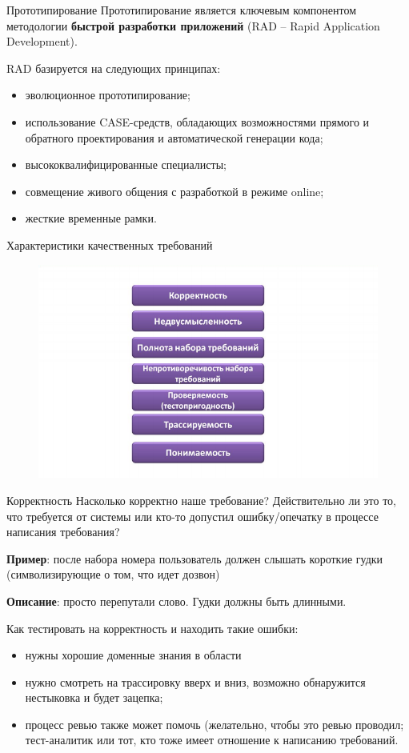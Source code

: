 \documentclass{beamer}
\begin{document}
\begin{frame}[t]{Прототипирование}
Прототипирование является ключевым компонентом методологии \textbf{быстрой разработки приложений} (RAD – Rapid Application Development). 

RAD базируется на следующих принципах:
\begin{itemize}
\item эволюционное прототипирование;
\item использование CASE-средств, обладающих возможностями прямого и обратного
проектирования и автоматической генерации кода;
\item высококвалифицированные специалисты;
\item совмещение живого общения с разработкой в режиме online;
\item жесткие временные рамки.
\end{itemize}
\end{frame}

\begin{frame}[t]{Характеристики качественных требований}
\begin{figure}[h]
\centering
\includegraphics[scale=0.5]{images/lec02-pic09.png}
\end{figure}
\end{frame}

\begin{frame}[t]{Корректность}
Насколько корректно наше требование? Действительно ли это то, что требуется от
системы или кто-то допустил ошибку/опечатку в процессе написания требования?

\textbf{Пример}: после набора номера пользователь должен слышать короткие гудки (символизирующие о том,
что идет дозвон)

\textbf{Описание}: просто перепутали слово. Гудки должны быть длинными.

Как тестировать на корректность и находить такие ошибки:
\begin{itemize}
\item нужны хорошие доменные знания в области 
\item нужно смотреть на трассировку вверх и вниз, возможно обнаружится нестыковка и будет зацепка;
\item процесс ревью также может помочь (желательно, чтобы это ревью проводил;
тест-аналитик или тот, кто тоже имеет отношение к написанию требований.
\end{itemize}
\end{frame}
\end{document}
